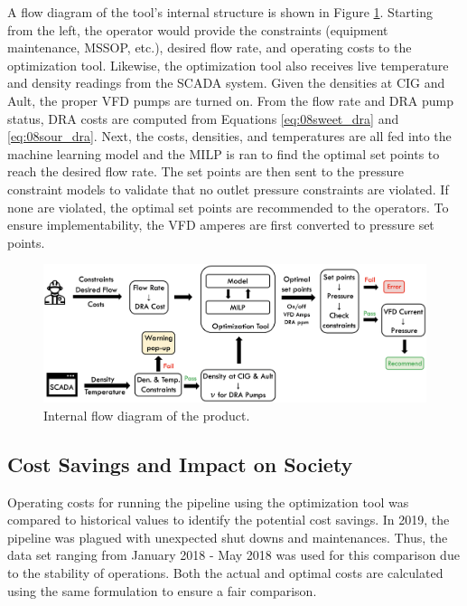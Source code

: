 A flow diagram of the tool's internal structure is shown in Figure \ref{fig:08Product_Flow}. Starting from the left, the operator would provide the constraints (equipment maintenance, MSSOP, etc.), desired flow rate, and operating costs to the optimization tool.  Likewise, the optimization tool also receives live temperature and density readings from the SCADA system.  Given the densities at CIG and Ault, the proper VFD pumps are turned on.  From the flow rate and DRA pump status, DRA costs are computed from Equations \ref{eq:08sweet_dra} and \ref{eq:08sour_dra}.  Next, the costs, densities, and temperatures are all fed into the machine learning model and the MILP is ran to find the optimal set points to reach the desired flow rate. The set points are then sent to the pressure constraint models to validate that no outlet pressure constraints are violated.  If none are violated, the optimal set points are recommended to the operators. To ensure implementability, the VFD amperes are first converted to pressure set points.

\begin{figure}[h]
    \centering
    \includegraphics[width=\textwidth]{images/08Product_Flow.png}
    \caption{Internal flow diagram of the product.}
    \label{fig:08Product_Flow}
\end{figure}

\subsection{Cost Savings and Impact on Society}
Operating costs for running the pipeline using the optimization tool was compared to historical values to identify the potential cost savings.  In 2019, the pipeline was plagued with unexpected shut downs and maintenances. Thus, the data set ranging from January 2018 - May 2018 was used for this comparison due to the stability of operations. Both the actual and optimal costs are calculated using the same formulation to ensure a fair comparison.  


